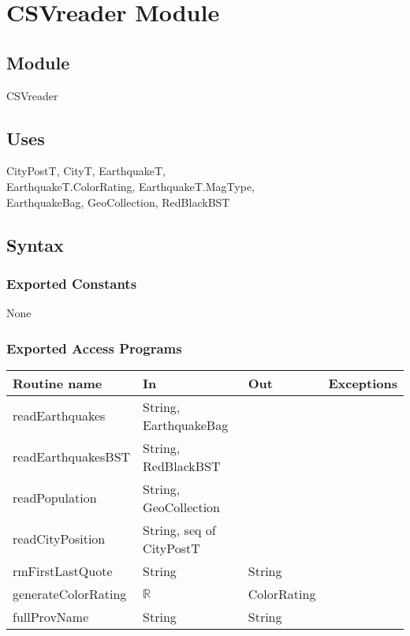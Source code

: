 \documentclass[12pt]{article}
\begin{document}
\newpage

\section* {CSVreader Module}

\subsection* {Module}

CSVreader

\subsection* {Uses}

CityPostT, CityT, EarthquakeT,\\
EarthquakeT.ColorRating, EarthquakeT.MagType,\\
EarthquakeBag, GeoCollection, RedBlackBST

\subsection* {Syntax}

\subsubsection* {Exported Constants}

None

\subsubsection* {Exported Access Programs}

\begin{tabular}{| l | l | l | l |}
\hline
\textbf{Routine name} & \textbf{In} & \textbf{Out} & \textbf{Exceptions}\\
\hline
readEarthquakes & String, EarthquakeBag & ~ & ~\\
\hline
readEarthquakesBST & String, RedBlackBST & ~ & ~\\
\hline
readPopulation & String, GeoCollection & ~ & ~\\
\hline
readCityPosition & String, seq of CityPostT & ~ & ~\\
\hline
rmFirstLastQuote & String & String & ~\\
\hline
generateColorRating & $\mathbb{R}$ & ColorRating & ~\\
\hline
fullProvName & String & String & ~\\
\hline
\end{tabular}
\end{document}
